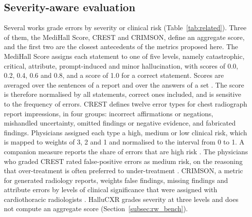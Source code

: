 \documentclass[11pt,a4paper]{article}
\begin{document}
\subsection{Severity-aware evaluation}
\label{subsec:rw_severity}

Several works grade errors by severity or clinical risk (Table~\ref{tab:related}). Three of them, the MediHall Score, CREST and CRIMSON, define an aggregate score, and the first two are the closest antecedents of the metrics proposed here. The MediHall Score assigns each statement to one of five levels, namely catastrophic, critical, attribute, prompt-induced and minor hallucination, with scores of 0.0, 0.2, 0.4, 0.6 and 0.8, and a score of 1.0 for a correct statement. Scores are averaged over the sentences of a report and over the answers of a set \citep{chen2024medhallmark}. The score is therefore normalised by all statements, correct ones included, and is sensitive to the frequency of errors. CREST defines twelve error types for chest radiograph report impressions, in four groups: incorrect affirmations or negations, mishandled uncertainty, omitted findings or negative evidence, and fabricated findings. Physicians assigned each type a high, medium or low clinical risk, which is mapped to weights of 3, 2 and 1 and normalised to the interval from 0 to 1. A companion measure reports the share of errors that are high risk \citep{crest2025medrxiv}. The physicians who graded CREST rated false-positive errors as medium risk, on the reasoning that over-treatment is often preferred to under-treatment \citep{crest2025medrxiv}. CRIMSON, a metric for generated radiology reports, weights false findings, missing findings and attribute errors by levels of clinical significance that were assigned with cardiothoracic radiologists \citep{baharoon2026crimson}. HalluCXR grades severity at three levels and does not compute an aggregate score (Section~\ref{subsec:rw_bench}).
\end{document}
